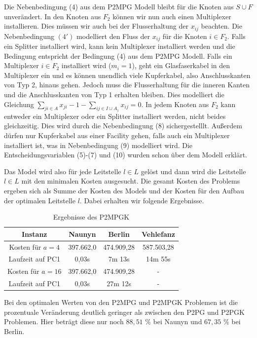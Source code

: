 \documentclass[11pt,a4paper]{article}
\theoremstyle{my_th_style1}
\begin{document}
Die Nebenbedingung (4) aus dem P2MPG Modell bleibt für die Knoten aus $S \cup F$ unver\"andert.
In den Knoten aus $F_2$ können wir nun auch einen Multiplexer installieren.
Dies müssen wir auch bei der Flusserhaltung der $x_{ij}$ beachten.
Die Nebenbedingung \((4')\) modelliert den Fluss der $x_{ij}$ für die Knoten $i \in F_2$.
Falls ein Splitter installiert wird, kann kein Multiplexer installiert werden und die Bedingung entspricht der Bedingung (4) aus dem P2MPG Modell.
Falls ein Multiplexer $i \in F_2$ installiert wird ($m_i=1$), geht ein Glasfaserkabel in den Multiplexer ein und es k\"onnen unendlich viele Kupferkabel, also Anschlusskanten von Typ 2, hinaus gehen.
Jedoch muss die Flusserhaltung f\"ur die inneren Kanten und die Anschlusskanten von Typ 1 erhalten bleiben.
Dies modelliert die Gleichung $\displaystyle\sum_{ji \in A} x_{ji} -1 - \displaystyle\sum_{ij \in I \cup A_1} x_{ij}=0$.
In jedem Knoten aus $F_2$ kann entweder ein Multiplexer oder ein Splitter installiert werden, nicht beides gleichzeitig.
Dies wird durch die Nebenbedingung (8) sichergestelllt.
Außerdem d\"urfen nur Kupferkabel aus einer Facility gehen, falls auch ein Multiplexer installiert ist, was in Nebenbedingung (9) modelliert wird.
Die Entscheidungsvariablen (5)-(7) und (10) wurden schon \"uber dem Modell erkl\"art.   

Das Model wird also für jede Leitstelle $l \in L$ gelöst und dann wird die Leitstelle $l \in L$ mit den minimalen Kosten ausgesucht. Die gesamt Kosten des Problems ergeben sich als Summe der Kosten des Models und der Kosten für den Aufbau der optimalen Leitstelle $l$. Dabei erhalten wir folgende Ergebnisse.

 \begin{table}[h]
	\centering
	\begin{tabular}{c|c|c|c}
		Instanz & Naunyn & Berlin & Vehlefanz \\	
		\hline
		Kosten für $a=4$ & 397.662,0 & 474.909,28 & 587.503,28 \\
		Laufzeit auf PC1 & 0,03s & 7m 13s & 14m 55s \\
		\hline
		Kosten für $a=16$ & 397.662,0 & 474.909,28 & -\\
		Laufzeit auf PC1 & 0,03s & 27m 12s & - \\
	\end{tabular}
	\caption{Ergebnisse des P2MPGK}
	\label{P2MPGK}
\end{table}

Bei den optimalen Werten von den P2MPG und P2MPGK Problemen ist die prozentuale Ver\"anderung deutlich geringer als zwischen den P2PG und P2PGK Problemen.
Hier betr\"agt diese nur noch \(88,51\) \% bei Naunyn und \(67,35\) \% bei Berlin.
\end{document}
